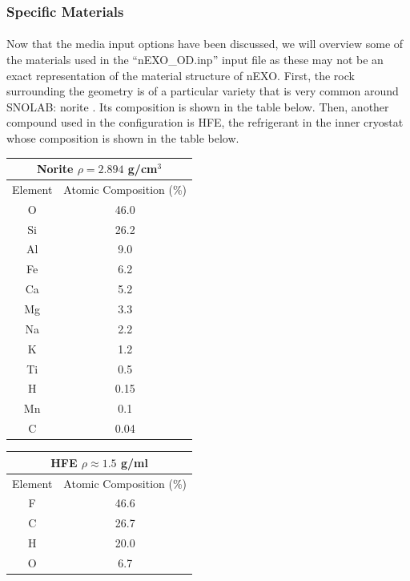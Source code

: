 \subsubsection{Specific Materials}
\paragraph{}
Now that the media input options have been discussed, we will overview some of the materials used in the ``nEXO\_OD.inp'' input file as these may not be an exact representation of the material structure of nEXO. First, the rock surrounding the geometry is of a particular variety that is very common around SNOLAB: norite \cite{SNOLAB_dose}. Its composition is shown in the table below. Then, another compound used in the configuration is HFE, the refrigerant in the inner cryostat whose composition is shown in the table below. 

\begin{center}
    \label{tab:norite}
    \begin{tabular}[h]{|c|c|}
        \hline
        \multicolumn{2}{|c|}{Norite $\rho = 2.894 $ g/cm$^3$} \\
        \hline
        \hline
        Element & Atomic Composition (\%) \\
        \hline
        O & 46.0 \\
        Si & 26.2 \\
        Al & 9.0 \\
        Fe & 6.2 \\
        Ca & 5.2 \\
        Mg & 3.3 \\
        Na & 2.2 \\
        K & 1.2 \\
        Ti & 0.5 \\
        H & 0.15 \\
        Mn & 0.1 \\
        C & 0.04 \\
        \hline
    \end{tabular}
    \quad
    \label{tab:HFE}
    \begin{tabular}[h]{|c|c|}
        \hline
        \multicolumn{2}{|c|}{HFE $\rho \approx 1.5 $ g/ml} \\
        \hline
        \hline
        Element & Atomic Composition (\%) \\
        \hline
        F & 46.6 \\
        C & 26.7 \\
        H & 20.0 \\
        O & 6.7 \\
        \hline
    \end{tabular}
\end{center}

